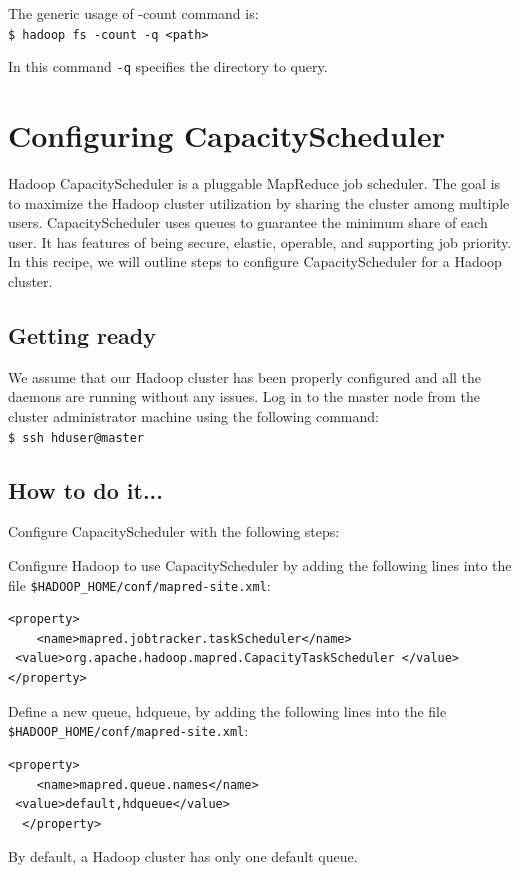 The generic usage of -count command is: \\
\verb|$ hadoop fs -count -q <path>|

In this command \verb|-q| specifies the directory to query. 

\section{Configuring CapacityScheduler}
Hadoop CapacityScheduler is a pluggable MapReduce job scheduler. The goal is to maximize the Hadoop cluster utilization by sharing the cluster among multiple users. CapacityScheduler uses queues to guarantee the minimum share of each user. It has features of being secure, elastic, operable, and supporting job priority. In this recipe, we will outline steps to configure CapacityScheduler for a Hadoop cluster.

\subsection*{Getting ready}
We assume that our Hadoop cluster has been properly configured and all the daemons are running without any issues.
Log in to the master node from the cluster administrator machine using the following command:\\
\verb|$ ssh hduser@master|

\subsection*{How to do it...}
Configure CapacityScheduler with the following steps: 

Configure Hadoop to use CapacityScheduler by adding the following lines into the file \verb|$HADOOP_HOME/conf/mapred-site.xml|:
\begin{verbatim}
<property>
    <name>mapred.jobtracker.taskScheduler</name>
 <value>org.apache.hadoop.mapred.CapacityTaskScheduler </value>
</property>
\end{verbatim}

Define a new queue, hdqueue, by adding the following lines into the file \verb|$HADOOP_HOME/conf/mapred-site.xml|:
\begin{verbatim}
<property>
    <name>mapred.queue.names</name>
 <value>default,hdqueue</value>
  </property>
\end{verbatim}

By default, a Hadoop cluster has only one default queue.

